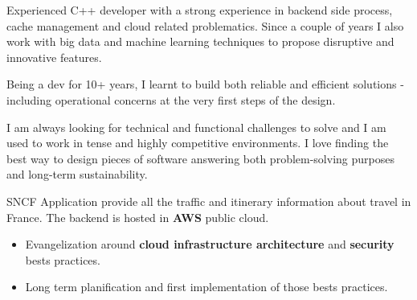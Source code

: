 \documentclass[10pt, a4paper, ragged2e]{altacv}
\begin{document}
\sloppy
{}

\begin{adjustwidth}{-5cm}{}
\makecvheader
\end{adjustwidth}

	\justify \quad Experienced C++ developer with a strong experience in backend side process, cache management and cloud related problematics. Since a couple of years I also work with big data and machine learning techniques to propose disruptive and innovative features.
	
	\medskip
	\justify \quad Being a dev for 10+ years, I learnt to build both reliable and efficient solutions - including operational concerns at the very first steps of the design.
	
	\medskip
	\justify \quad I am always looking for technical and functional challenges to solve and I am used to work in tense and highly competitive environments. I love finding the best way to design pieces of software answering both problem-solving purposes and long-term sustainability.


\bigskip
{}
		
		SNCF Application provide all the traffic and itinerary information about travel in France. The backend is hosted in \textbf{AWS} public cloud.
		
		\medskip
		\begin{itemize}	
			\item Evangelization around \textbf{cloud infrastructure architecture} and \textbf{security} bests practices.
			\item Long term planification and first implementation of those bests practices.
		\end{itemize}
	\divider
\end{document}
